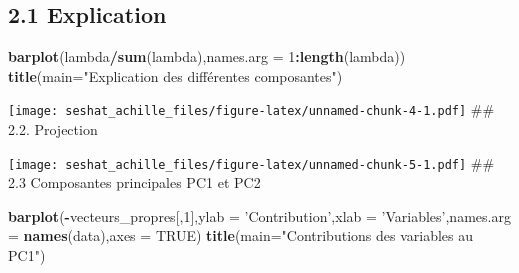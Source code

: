 \documentclass[
]{article}
\newenvironment{Shaded}{\begin{snugshade}}{\end{snugshade}}
\newcommand{\CommentTok}[1]{\textcolor[rgb]{0.56,0.35,0.01}{\textit{#1}}}
\newcommand{\DataTypeTok}[1]{\textcolor[rgb]{0.13,0.29,0.53}{#1}}
\newcommand{\DecValTok}[1]{\textcolor[rgb]{0.00,0.00,0.81}{#1}}
\newcommand{\KeywordTok}[1]{\textcolor[rgb]{0.13,0.29,0.53}{\textbf{#1}}}
\newcommand{\NormalTok}[1]{#1}
\newcommand{\OperatorTok}[1]{\textcolor[rgb]{0.81,0.36,0.00}{\textbf{#1}}}
\newcommand{\OtherTok}[1]{\textcolor[rgb]{0.56,0.35,0.01}{#1}}
\newcommand{\StringTok}[1]{\textcolor[rgb]{0.31,0.60,0.02}{#1}}
\begin{document}
\hypertarget{explication}{%
\subsection{2.1 Explication}\label{explication}}

\begin{Shaded}
\begin{Highlighting}[]
\KeywordTok{barplot}\NormalTok{(lambda}\OperatorTok{/}\KeywordTok{sum}\NormalTok{(lambda),}\DataTypeTok{names.arg =} \DecValTok{1}\OperatorTok{:}\KeywordTok{length}\NormalTok{(lambda))}
\KeywordTok{title}\NormalTok{(}\DataTypeTok{main=}\StringTok{"Explication des différentes composantes"}\NormalTok{)}
\end{Highlighting}
\end{Shaded}

\texttt{[image: seshat\_achille\_files/figure-latex/unnamed-chunk-4-1.pdf]}
\#\# 2.2. Projection

\begin{Shaded}
\end{Shaded}

\texttt{[image: seshat\_achille\_files/figure-latex/unnamed-chunk-5-1.pdf]}
\#\# 2.3 Composantes principales PC1 et PC2

\begin{Shaded}
\begin{Highlighting}[]
\KeywordTok{barplot}\NormalTok{(}\OperatorTok{-}\NormalTok{vecteurs_propres[,}\DecValTok{1}\NormalTok{],}\DataTypeTok{ylab =} \StringTok{'Contribution'}\NormalTok{,}\DataTypeTok{xlab =} \StringTok{'Variables'}\NormalTok{,}\DataTypeTok{names.arg =} \KeywordTok{names}\NormalTok{(data),}\DataTypeTok{axes =} \OtherTok{TRUE}\NormalTok{)}
\KeywordTok{title}\NormalTok{(}\DataTypeTok{main=}\StringTok{"Contributions des variables au PC1"}\NormalTok{)}
\end{Highlighting}
\end{Shaded}
\end{document}
